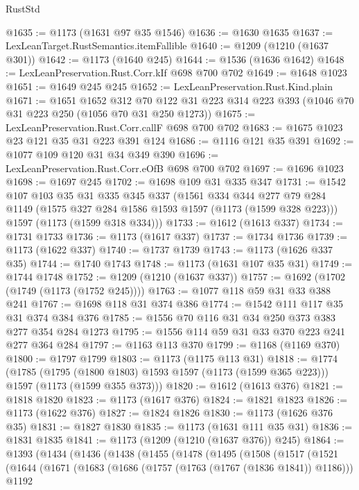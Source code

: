 \begin{lexlean}{RustStd}
\begin{coremodule}
@1635 := @1173 (@1631 @97 @35 @1546)
@1636 := @1630 @1635
@1637 := LexLeanTarget.RustSemantics.itemFallible
@1640 := @1209 (@1210 (@1637 @301))
@1642 := @1173 (@1640 @245)
@1644 := @1536 (@1636 @1642)
@1648 := LexLeanPreservation.Rust.Corr.kIf @698 @700 @702
@1649 := @1648 @1023
@1651 := @1649 @245 @245
@1652 := LexLeanPreservation.Rust.Kind.plain
@1671 := @1651
    @1652
    @312
    @70
    @122
    @31
    @223
    @314
    @223
    @393
    (@1046 @70 @31 @223 @250 (@1056 @70 @31 @250 @1273))
@1675 := LexLeanPreservation.Rust.Corr.callF @698 @700 @702
@1683 := @1675 @1023 @23 @121 @35 @31 @223 @391 @124
@1686 := @1116 @121 @35 @391
@1692 := @1077 @109 @120 @31 @34 @349 @390
@1696 := LexLeanPreservation.Rust.Corr.eOfB @698 @700 @702
@1697 := @1696 @1023
@1698 := @1697 @245
@1702 := @1698 @109 @31 @335 @347
@1731 := @1542
    @107
    @103
    @35
    @31
    @335
    @345
    @337
    (@1561
      @334
      @344
      @277
      @79
      @284
      @1149
      (@1575 @327 @284 @1586 @1593 @1597 (@1173 (@1599 @328 @223)))
      @1597
      (@1173 (@1599 @318 @334)))
@1733 := @1612 (@1613 @337)
@1734 := @1731 @1733
@1736 := @1173 (@1617 @337)
@1737 := @1734 @1736
@1739 := @1173 (@1622 @337)
@1740 := @1737 @1739
@1743 := @1173 (@1626 @337 @35)
@1744 := @1740 @1743
@1748 := @1173 (@1631 @107 @35 @31)
@1749 := @1744 @1748
@1752 := @1209 (@1210 (@1637 @337))
@1757 := @1692 (@1702 (@1749 (@1173 (@1752 @245))))
@1763 := @1077 @118 @59 @31 @33 @388 @241
@1767 := @1698 @118 @31 @374 @386
@1774 := @1542 @111 @117 @35 @31 @374 @384 @376
@1785 := @1556 @70 @116 @31 @34 @250 @373 @383 @277 @354 @284 @1273
@1795 := @1556 @114 @59 @31 @33 @370 @223 @241 @277 @364 @284
@1797 := @1163 @113 @370
@1799 := @1168 (@1169 @370)
@1800 := @1797 @1799
@1803 := @1173 (@1175 @113 @31)
@1818 := @1774
    (@1785
      (@1795 (@1800 @1803) @1593 @1597 (@1173 (@1599 @365 @223)))
      @1597
      (@1173 (@1599 @355 @373)))
@1820 := @1612 (@1613 @376)
@1821 := @1818 @1820
@1823 := @1173 (@1617 @376)
@1824 := @1821 @1823
@1826 := @1173 (@1622 @376)
@1827 := @1824 @1826
@1830 := @1173 (@1626 @376 @35)
@1831 := @1827 @1830
@1835 := @1173 (@1631 @111 @35 @31)
@1836 := @1831 @1835
@1841 := @1173 (@1209 (@1210 (@1637 @376)) @245)
@1864 := @1393
    (@1434
      (@1436
        (@1438
          (@1455
            (@1478
              (@1495
                (@1508
                  (@1517
                    (@1521
                      (@1644
                        (@1671
                          (@1683
                            (@1686 (@1757 (@1763 (@1767 (@1836 @1841)) @1186)))
                            @1192

\end{coremodule}
\end{lexlean}

